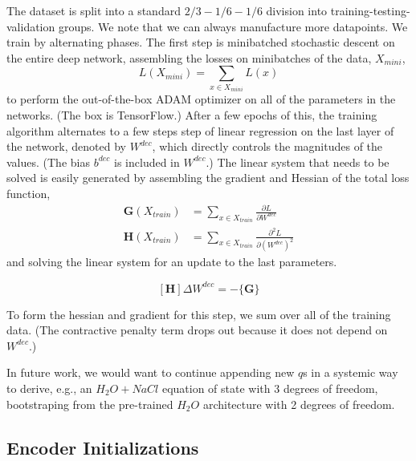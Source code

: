 \documentclass[]{article}
\begin{document}
The dataset is split into a standard $2/3-1/6-1/6$ division into
training-testing-validation groups. We note that we can always
manufacture more datapoints. We train by alternating phases. The first
step is minibatched stochastic descent on the entire deep network, assembling the losses on minibatches of the data, $X_{mini}$,
\begin{equation}
  L(X_{mini}) = \sum_{x\in X_{mini}} L(x)
  \end{equation}
to perform the out-of-the-box ADAM optimizer on all of the
parameters in the networks. (The box is
TensorFlow.) After a few epochs of this,
the training algorithm alternates to a few steps step of linear regression on the last layer of the network,
denoted by \(W^{dec}\), which directly controls the magnitudes of the values.
(The bias $b^{dec}$ is included in $W^{dec}$.) The linear
system that needs to be solved is easily generated by assembling the
gradient and Hessian of the total loss function,
\begin{align}
 \mathbf{G}\left(X_{train}\right) &= \sum_{x\in X_{train}}\frac{\partial L}{\partial W^{dec}} \\
\mathbf{H}\left(X_{train}\right) &= \sum_{x\in X_{train}}\frac{\partial^2 L}{\partial (W^{dec})^2}
\end{align}
and solving the linear system for an update to the last parameters.

\[[\mathbf{H}] \Delta W^{dec} = -\{\mathbf{G}\}\]

To form the hessian and gradient for this step, we sum over all of the
training data. (The contractive penalty term drops out because it does
not depend on \(W^{dec}\).)

In future work, we would want to continue appending new \(q\)s in a
systemic way to derive, e.g., an \(H_2O + NaCl\) equation of state with
3 degrees of freedom, bootstraping from the pre-trained \(H_2O\)
architecture with 2 degrees of freedom.

\hypertarget{header-n3312}{%
\subsection{Encoder Initializations}\label{header-n3312}}
\end{document}
